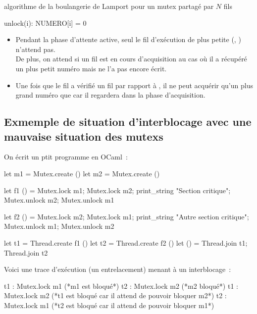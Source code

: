 \begin{adjustwidth}{-3cm}{-3cm}
\begin{implementation}{algorithme de la boulangerie de Lamport pour un mutex partagé par $N$ fils}
\begin{lstLNat}
    unlock(i):
        NUMERO[i] = 0
    \end{lstLNat}
\end{implementation}

\begin{remarque}{}{}
    \begin{itemize}
        \item Pendant la phase d'attente active, seul le fil d'exécution de plus petite (, ) n'attend pas.\\
        De plus, on attend si un fil est en cours d'acquisition au cas où il a récupéré un plus petit numéro mais ne l'a pas encore écrit.
        \item Une fois que le fil  a vérifié un fil  par rapport à , il ne peut acquérir qu'un plus grand numéro que  car il regardera  dans la phase d'acquisition.
    \end{itemize}
\end{remarque}

\subsection{Exmemple de situation d'interblocage avec une mauvaise situation des mutexs}

On écrit un ptit programme en OCaml~:
\begin{lstOCaml}
    let m1 = Mutex.create ()
    let m2 = Mutex.create ()

    let f1 () = 
        Mutex.lock m1;
        Mutex.lock m2;
        print_string "Section critique\n";
        Mutex.unlock m2;
        Mutex.unlock m1

    let f2 () = 
        Mutex.lock m2;
        Mutex.lock m1;
        print_string "Autre section critique\n";
        Mutex.unlock m1;
        Mutex.unlock m2
    
    let t1 = Thread.create f1 ()
    let t2 = Thread.create f2 ()
    let () = Thread.join t1; Thread.join t2
\end{lstOCaml}

Voici une trace d'exécution (un entrelacement) menant à un interblocage~:
\begin{lstLNat}
    t1 : Mutex.lock m1 (*m1 est bloqué*)
    t2 : Mutex.lock m2 (*m2 bloqué*)
    t1 : Mutex.lock m2 (*t1 est bloqué car il attend de pouvoir bloquer m2*)
    t2 : Mutex.lock m1 (*t2 est bloqué car il attend de pouvoir bloquer m1*)
\end{lstLNat}


\end{adjustwidth}
